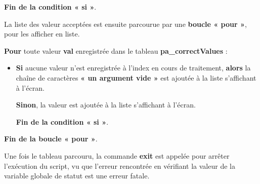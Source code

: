 \documentclass[a4paper,10pt]{article}
\begin{document}
\begin{justify}
    \textbf{\color{cond} Fin de la condition « si »}.
\end{justify}

\setlength{\parskip}{2em}


\begin{justify}
    La liste des valeur acceptées est ensuite parcourue par une \textbf{\color{loop}boucle « pour »}, pour les afficher en liste.
\end{justify}

\setlength{\parskip}{1em}

\begin{justify}
    \textbf{\color{loop}Pour} toute valeur \textbf{\color{vars}val} enregistrée dans le tableau \textbf{\color{vars}pa\_correctValues} :
\end{justify}

\begin{itemize}
    \item
    {
        \begin{justify}
            \textbf{\color{cond}Si} aucune valeur n'est enregistrée à l'index en cours de traitement, \textbf{\color{cond}alors} la chaîne de caractères \textbf{« un argument vide »} est ajoutée à la liste s'affichant à l'écran.
        \end{justify}

        \setlength{\parskip}{1em}

        \begin{justify}
            \textbf{\color{cond}Sinon}, la valeur est ajoutée à la liste s'affichant à l'écran.
        \end{justify}

        \begin{justify}
            \textbf{\color{cond} Fin de la condition « si »}.
        \end{justify}
    }
\end{itemize}

\begin{justify}
    \textbf{\color{loop} Fin de la boucle « pour »}.
\end{justify}

\setlength{\parskip}{2em}

\begin{justify}
    Une fois le tableau parcouru, la commande \textbf{\color{cmds}exit} est appelée pour arrêter l'exécution du script, vu que l'erreur rencontrée en vérifiant la valeur de la variable globale de statut est une erreur fatale.
\end{justify}
\end{document}
